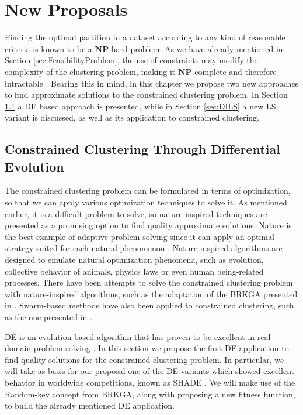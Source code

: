 \chapter{New Proposals}\label{ch:NewProposals}

Finding the optimal partition in a dataset according to any kind of reasonable criteria is known to be a $\mathbf{NP}$-hard problem. As we have already mentioned in Section \ref{sec:FeasibilityProblem}, the use of constraints may modify the complexity of the clustering problem, making it $\mathbf{NP}$-complete and therefore intractable \cite{davidson2005clustering}. Bearing this in mind, in this chapter we propose two new approaches to find approximate solutions to the constrained clustering problem. In Section \ref{sec:CCSHADE} a \acf{DE} based approach is presented, while in Section \ref{sec:DILS} a new \acf{LS} variant is discussed, as well as its application to constrained clustering.


\section{Constrained Clustering Through Differential Evolution} \label{sec:CCSHADE}

The constrained clustering problem can be formulated in terms of optimization, so that we can apply various optimization techniques to solve it. As mentioned earlier, it is a difficult problem to solve, so nature-inspired techniques are presented as a promising option to find quality approximate solutions. Nature is the best example of adaptive problem solving since it can apply an optimal strategy suited for each natural phenomenon \cite{fausto2019ants}. Nature-inspired algorithms are designed to emulate natural optimization phenomena, such as evolution, collective behavior of animals, physics laws or even human being-related processes. There have been attempts to solve the constrained clustering problem with nature-inspired algorithms, such as the adaptation of the \acf{BRKGA} presented in \cite{de2017comparison}. Swarm-based methods have also been applied to constrained clustering, such as the one presented in \cite{xu2013improving}.

\acs{DE} is an evolution-based algorithm that has proven to be excellent in real-domain problem solving \cite{das2011differential}. In this section we propose the first \acs{DE} application to find quality solutions for the constrained clustering problem. In particular, we will take as basis for our proposal one of the \acs{DE} variants which showed excellent behavior in worldwide competitions, known as \acs{SHADE} \cite{molina2018insight}. We will make use of the Random-key concept from \acs{BRKGA}, along with proposing a new fitness function, to build the already mentioned \acs{DE} application.

